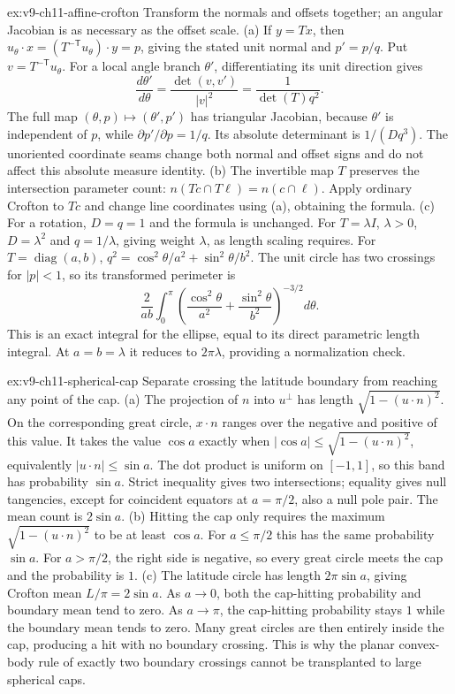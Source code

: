 \begin{solution}{ex:v9-ch11-affine-crofton}
\idea Transform the normals and offsets together; an angular Jacobian is as necessary as the offset scale.
\writeup (a) If $y=Tx$, then $u_\theta\cdot x=(T^{-\mathsf T}u_\theta)\cdot y=p$, giving the stated unit normal and $p'=p/q$. Put $v=T^{-\mathsf T}u_\theta$. For a local angle branch $\theta'$, differentiating its unit direction gives
\[
\frac{d\theta'}{d\theta}=\frac{\det(v,v')}{|v|^2}
=\frac1{\det(T)q^2}.
\]
The full map $(\theta,p)\mapsto(\theta',p')$ has triangular Jacobian, because $\theta'$ is independent of $p$, while $\partial p'/\partial p=1/q$. Its absolute determinant is $1/(Dq^3)$. The unoriented coordinate seams change both normal and offset signs and do not affect this absolute measure identity.
(b) The invertible map $T$ preserves the intersection parameter count: $n(Tc\cap T\ell)=n(c\cap\ell)$. Apply ordinary Crofton to $Tc$ and change line coordinates using (a), obtaining the formula.
(c) For a rotation, $D=q=1$ and the formula is unchanged. For $T=\lambda I$, $\lambda>0$, $D=\lambda^2$ and $q=1/\lambda$, giving weight $\lambda$, as length scaling requires. For $T=\operatorname{diag}(a,b)$, $q^2=\cos^2\theta/a^2+\sin^2\theta/b^2$. The unit circle has two crossings for $|p|<1$, so its transformed perimeter is
\[
\frac2{ab}\int_0^\pi
\left(\frac{\cos^2\theta}{a^2}+\frac{\sin^2\theta}{b^2}\right)^{-3/2}d\theta.
\]
This is an exact integral for the ellipse, equal to its direct parametric length integral. At $a=b=\lambda$ it reduces to $2\pi\lambda$, providing a normalization check.
\end{solution}

\begin{solution}{ex:v9-ch11-spherical-cap}
\idea Separate crossing the latitude boundary from reaching any point of the cap.
\writeup (a) The projection of $n$ into $u^\perp$ has length $\sqrt{1-(u\cdot n)^2}$. On the corresponding great circle, $x\cdot n$ ranges over the negative and positive of this value. It takes the value $\cos a$ exactly when
$|\cos a|\le\sqrt{1-(u\cdot n)^2}$, equivalently $|u\cdot n|\le\sin a$. The dot product is uniform on $[-1,1]$, so this band has probability $\sin a$. Strict inequality gives two intersections; equality gives null tangencies, except for coincident equators at $a=\pi/2$, also a null pole pair. The mean count is $2\sin a$.
(b) Hitting the cap only requires the maximum $\sqrt{1-(u\cdot n)^2}$ to be at least $\cos a$. For $a\le\pi/2$ this has the same probability $\sin a$. For $a>\pi/2$, the right side is negative, so every great circle meets the cap and the probability is $1$.
(c) The latitude circle has length $2\pi\sin a$, giving Crofton mean $L/\pi=2\sin a$. As $a\to0$, both the cap-hitting probability and boundary mean tend to zero. As $a\to\pi$, the cap-hitting probability stays $1$ while the boundary mean tends to zero. Many great circles are then entirely inside the cap, producing a hit with no boundary crossing. This is why the planar convex-body rule of exactly two boundary crossings cannot be transplanted to large spherical caps.
\end{solution}

